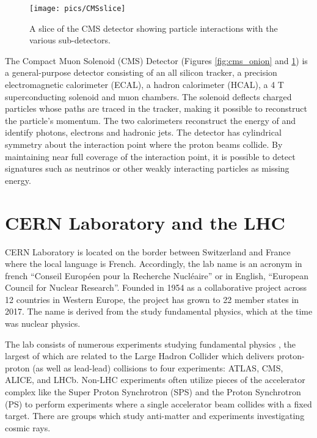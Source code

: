 \begin{figure}
\begin{center}
\texttt{[image: pics/CMSslice]}
\caption{A slice of the CMS detector showing particle interactions with the various
sub-detectors. \label{fig:cms_transverse}}
\end{center}
\end{figure}


The Compact Muon Solenoid (CMS) Detector (Figures \ref{fig:cms_onion} and \ref{fig:cms_transverse}) is a general-purpose detector consisting of 
an all silicon tracker, a precision electromagnetic calorimeter (ECAL), a hadron calorimeter
 (HCAL), a 4 T superconducting solenoid and muon chambers. The solenoid deflects charged
 particles whose paths are traced in the tracker, making it possible to 
reconstruct the particle's momentum. The two calorimeters reconstruct the energy 
of and identify photons, electrons and hadronic jets.
The detector has cylindrical symmetry about the
 interaction point where the proton beams collide. By maintaining near full coverage 
of the interaction point, it is possible to detect signatures such as neutrinos or other 
weakly interacting particles as missing energy. 


\section{CERN Laboratory and the LHC}

CERN Laboratory is located on the border between Switzerland and France where the local language is French. Accordingly,
the lab name is an acronym in french ``Conseil Europ\'een pour la Recherche Nucl\'eaire'' or in English, ``European
Council for Nuclear Research''. Founded in 1954 as a collaborative project across 12 countries in Western 
Europe, the project has grown to 22 member states in 2017. The name is derived from the study 
fundamental physics, which at the time was nuclear physics.

The lab consists of numerous experiments studying fundamental physics \cite{experiments}, 
the largest of which are related to the
Large Hadron Collider which delivers proton-proton (as well as lead-lead) collisions to four
experiments: ATLAS, CMS, ALICE, and LHCb. Non-LHC experiments often utilize pieces of the accelerator
complex like the Super Proton Synchrotron (SPS) and the Proton Synchrotron (PS) to perform experiments 
where a single accelerator beam collides with a fixed target. There are groups
which study anti-matter and experiments investigating cosmic rays.

